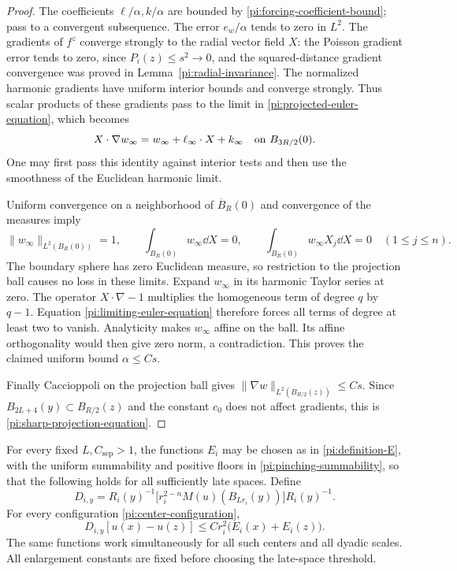 \begin{proof}
The coefficients $\ell/\alpha,k/\alpha$ are bounded by
\eqref{pi:forcing-coefficient-bound}; pass to a convergent
subsequence.  The error $e_w/\alpha$ tends to zero in $L^2$.
The gradients of $f^z$ converge strongly to the radial vector
field $X$: the Poisson gradient error tends to zero, since
$P_i(z)\le s^2\to0$, and the squared-distance gradient
convergence was proved in
Lemma~\ref{pi:radial-invariance}.  The normalized harmonic
gradients have uniform interior bounds and converge strongly.
Thus scalar products of these gradients pass to the limit in
\eqref{pi:projected-euler-equation}, which becomes
\begin{equation}
 X\cdot\nabla w_\infty
 =w_\infty+\ell_\infty\cdot X+k_\infty
 \quad\hbox{on }B_{3R/2}(0).
 \label{pi:limiting-euler-equation}
\end{equation}
One may first pass this identity against interior tests and then
use the smoothness of the Euclidean harmonic limit.

Uniform convergence on a neighborhood of $\overline B_R(0)$
and convergence of the measures imply
\[
 \|w_\infty\|_{L^2(B_R(0))}=1,\qquad
 \int_{B_R(0)}w_\infty\dd X=0,\qquad
 \int_{B_R(0)}w_\infty X_j\dd X=0\quad(1\le j\le n).
\]
The boundary sphere has zero Euclidean measure, so restriction
to the projection ball causes no loss in these limits.
Expand $w_\infty$ in its harmonic Taylor series at zero.
The operator $X\cdot\nabla-1$ multiplies the homogeneous term
of degree $q$ by $q-1$.  Equation
\eqref{pi:limiting-euler-equation} therefore forces all terms of
degree at least two to vanish.  Analyticity makes $w_\infty$
affine on the ball.  Its affine orthogonality would then give
zero norm, a contradiction.  This proves the claimed uniform
bound $\alpha\le Cs$.

Finally Caccioppoli on the projection ball gives
$\|\nabla w\|_{L^2(B_{R/2}(z))}\le Cs$.
Since $B_{2L+4}(y)\subset B_{R/2}(z)$ and the constant $c_0$
does not affect gradients, this is
\eqref{pi:sharp-projection-equation}.
\end{proof}

\begin{proposition}
\label{pi:directional-pinching}
For every fixed $L,C_{\mathrm{sep}}>1$, the functions $E_i$ may be chosen
as in \eqref{pi:definition-E}, with the uniform summability and
positive floors in \eqref{pi:pinching-summability}, so that the
following holds for all sufficiently late spaces.  Define
\[
 D_{i,y}=R_i(y)^{-1}
       \bigl[r_i^{2-n}M(u)(B_{Lr_i}(y))\bigr]R_i(y)^{-1}.
\]
For every configuration \eqref{pi:center-configuration},
\begin{equation}
 D_{i,y}[u(x)-u(z)]
 \le Cr_i^2\bigl(E_i(x)+E_i(z)\bigr).
 \label{pi:directional-estimate}
\end{equation}
The same functions work simultaneously for all such centers and
all dyadic scales.  All enlargement constants are fixed before
choosing the late-space threshold.
\end{proposition}

